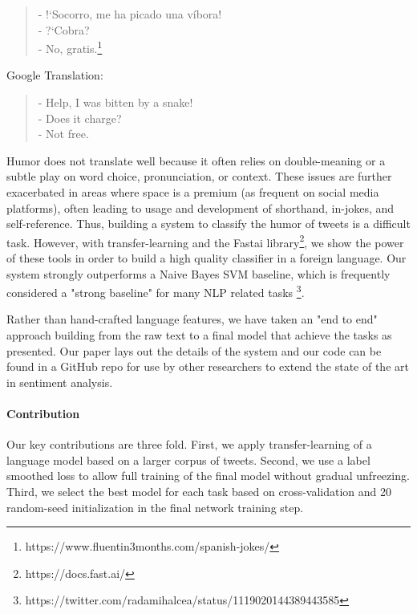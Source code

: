 \documentclass[smallextended]{svjour3}       %
\begin{document}
\begin{quote}
- !`Socorro, me ha picado una víbora!\\
- ?`Cobra?\\
- No, gratis.\footnote{https://www.fluentin3months.com/spanish-jokes/}
\end{quote}
Google Translation:
\begin{quote}
- Help, I was bitten by a snake!\\
- Does it charge?\\
- Not free.
\end{quote}
Humor does not translate well because it often relies on double-meaning or a subtle play on word choice, pronunciation, or context.  These issues are further exacerbated in areas where space is a premium (as frequent on social media platforms), often leading to usage and development of shorthand, in-jokes, and self-reference. Thus, building a system to classify the humor of tweets is a difficult task.  However, with transfer-learning and the Fastai library\footnote{https://docs.fast.ai/}, we show the power of these tools in order to build a high quality classifier in a foreign language. Our system strongly outperforms a Naive Bayes SVM baseline, which is frequently considered a "strong baseline" for many NLP related tasks \footnote{https://twitter.com/radamihalcea/status/1119020144389443585}.

Rather than hand-crafted language features, we have taken an "end to end" approach building from the raw text to a final model that achieve the tasks as presented.  Our paper lays out the details of the system and our code can be found in a GitHub repo for use by other researchers to extend the state of the art in sentiment analysis. 

\paragraph{Contribution} Our key contributions are three fold.  First, we apply transfer-learning of a language model based on a larger corpus of tweets.  Second, we use a label smoothed loss to allow full training of the final model without gradual unfreezing.  Third, we select the best model for each task based on cross-validation and 20 random-seed initialization in the final network training step.
\end{document}
